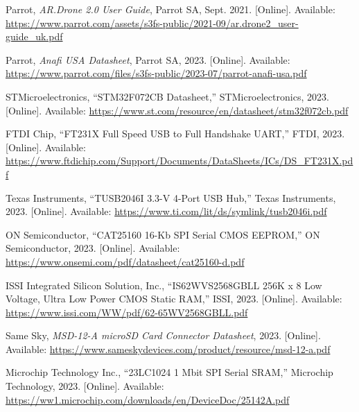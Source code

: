 \documentclass[12pt]{article}
\begin{document}
\newpage
\begin{thebibliography}{99}

Parrot, \emph{AR.Drone 2.0 User Guide}, Parrot SA, Sept. 2021. [Online]. Available: \url{https://www.parrot.com/assets/s3fs-public/2021-09/ar.drone2_user-guide_uk.pdf}

Parrot, \emph{Anafi USA Datasheet}, Parrot SA, 2023. [Online]. Available: \url{https://www.parrot.com/files/s3fs-public/2023-07/parrot-anafi-usa.pdf}

STMicroelectronics, ``STM32F072CB Datasheet,'' STMicroelectronics, 2023. [Online]. Available: \url{https://www.st.com/resource/en/datasheet/stm32f072cb.pdf}

FTDI Chip, ``FT231X Full Speed USB to Full Handshake UART,'' FTDI, 2023. [Online]. Available: \url{https://www.ftdichip.com/Support/Documents/DataSheets/ICs/DS_FT231X.pdf}

Texas Instruments, ``TUSB2046I 3.3-V 4-Port USB Hub,'' Texas Instruments, 2023. [Online]. Available: \url{https://www.ti.com/lit/ds/symlink/tusb2046i.pdf}

ON Semiconductor, ``CAT25160 16-Kb SPI Serial CMOS EEPROM,'' ON Semiconductor, 2023. [Online]. Available: \url{https://www.onsemi.com/pdf/datasheet/cat25160-d.pdf}

ISSI Integrated Silicon Solution, Inc., ``IS62WVS2568GBLL 256K x 8 Low Voltage, Ultra Low Power CMOS Static RAM,'' ISSI, 2023. [Online]. Available: \url{https://www.issi.com/WW/pdf/62-65WV2568GBLL.pdf}

Same Sky, \emph{MSD-12-A microSD Card Connector Datasheet}, 2023. [Online]. Available: \url{https://www.sameskydevices.com/product/resource/msd-12-a.pdf}

Microchip Technology Inc., ``23LC1024 1 Mbit SPI Serial SRAM,'' Microchip Technology, 2023. [Online]. Available: \url{https://ww1.microchip.com/downloads/en/DeviceDoc/25142A.pdf}


\end{thebibliography}
\end{document}
